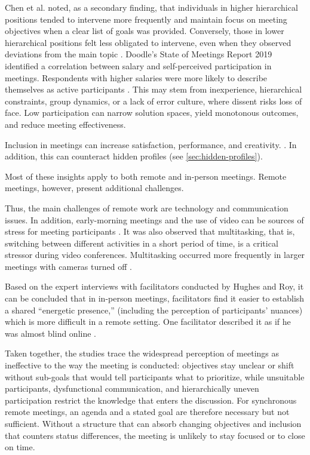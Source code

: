 Chen et al. noted, as a secondary finding, that individuals in higher hierarchical positions tended to
intervene more frequently and maintain focus on meeting objectives when a clear list of goals was provided.
Conversely, those in lower hierarchical positions felt less obligated to intervene, even when they observed
deviations from the main topic \cite[chap 4.3]{chenAreWeTrack2025}.
Doodle’s State of Meetings Report 2019 identified a correlation between salary and self-perceived
participation in meetings. Respondents with higher salaries were more likely to describe themselves as active
participants \cite[p. 6]{DoodleStateMeetings2019}.
This may stem from inexperience, hierarchical constraints, group dynamics, or a lack of error culture, where
dissent risks loss of face. Low participation can narrow solution spaces, yield monotonous outcomes, and
reduce meeting effectiveness.

Inclusion in meetings can increase satisfaction, performance, and creativity.
\cite[p.1]{houttiObserveAskIntervene2025}. In addition, this can counteract hidden profiles
(see \autoref{sec:hidden-profiles}).

Most of these insights apply to both remote and in-person meetings. Remote meetings,
however, present additional challenges.

Thus, the main challenges of remote work are technology and communication issues. In addition,
early-morning meetings and the use of video can be sources of stress for meeting participants
\cite[p.151]{luebstorfDiggingZoomFatigue2023}.
It was also observed that multitasking, that is, switching between different activities in a short
period of time, is a critical stressor during video conferences. Multitasking occurred more frequently in
larger meetings with
cameras turned off \cite[p. 159]{luebstorfDiggingZoomFatigue2023}.

Based on the expert interviews with facilitators conducted by Hughes and Roy, it can be concluded that in
in-person meetings, facilitators find it easier to establish a shared “energetic presence,” (including the
perception of participants’ nuances) which is more difficult in a remote setting. One facilitator described
it as if he was almost blind online
\cite[p.10]{hughesKeeperSynchronousOnline2021}.

Taken together, the studies trace the widespread perception of meetings as ineffective to the way the
meeting is conducted: objectives stay unclear or shift without sub-goals that would tell participants
what to prioritize, while unsuitable participants, dysfunctional communication, and hierarchically uneven
participation restrict the knowledge that enters the discussion. For synchronous remote meetings, an
agenda and a stated goal are therefore necessary but not sufficient. Without a structure that can absorb
changing objectives and inclusion that counters status differences, the meeting is unlikely to stay
focused or to close on time.

